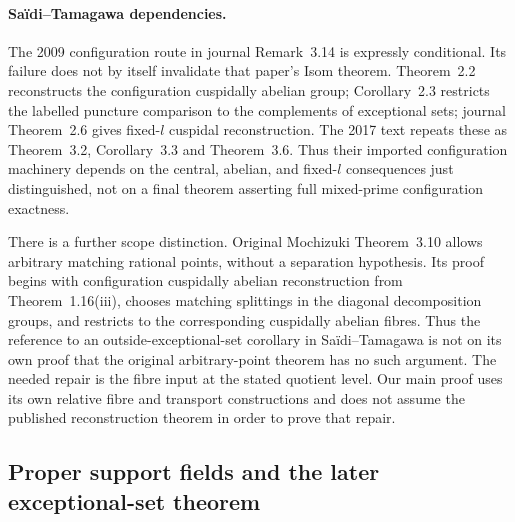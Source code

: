 \paragraph{Sa\"idi--Tamagawa dependencies.}
The 2009 configuration route in journal Remark~3.14 is expressly
conditional. Its failure does not by itself invalidate that paper's
Isom theorem. Theorem~2.2 reconstructs the configuration cuspidally
abelian group; Corollary~2.3 restricts the labelled puncture comparison
to the complements of exceptional sets; journal Theorem~2.6 gives
fixed-$l$ cuspidal reconstruction. The 2017 text repeats these as
Theorem~3.2, Corollary~3.3 and Theorem~3.6. Thus their imported
configuration machinery depends on the central, abelian, and fixed-$l$
consequences just distinguished, not on a final theorem asserting
full mixed-prime configuration exactness.

There is a further scope distinction. Original Mochizuki Theorem~3.10
allows arbitrary matching rational points, without a separation
hypothesis. Its proof begins with configuration cuspidally abelian
reconstruction from Theorem~1.16(iii), chooses matching splittings in
the diagonal decomposition groups, and restricts to the corresponding
cuspidally abelian fibres. Thus the reference to an outside-exceptional-set
corollary in Sa\"idi--Tamagawa is not on its own proof that the original
arbitrary-point theorem has no such argument. The needed repair is the
fibre input at the stated quotient level. Our main proof uses its own
relative fibre and transport constructions and does not assume the
published reconstruction theorem in order to prove that repair.
\citep{LA_ST2009,LA_ST2017,LA_Mochizuki2007}

\subsection{Proper support fields and the later exceptional-set theorem}

